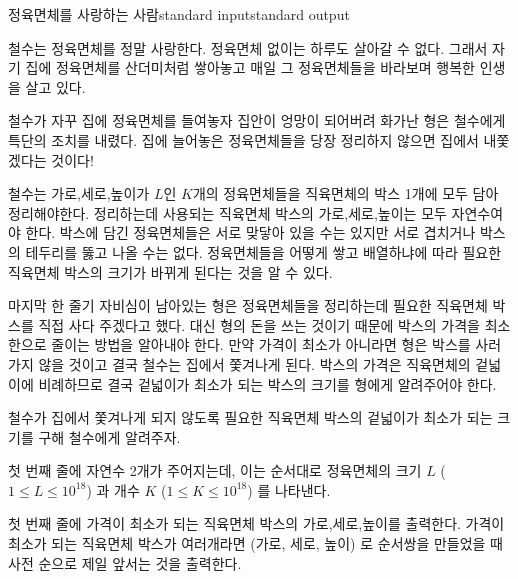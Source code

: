 \begin{problem}{정육면체를 사랑하는 사람}{standard input}{standard output}

철수는 정육면체를 정말 사랑한다. 정육면체 없이는 하루도 살아갈 수 없다.
그래서 자기 집에 정육면체를 산더미처럼 쌓아놓고 매일 그 정육면체들을 바라보며 행복한 인생을 살고 있다.

철수가 자꾸 집에 정육면체를 들여놓자 집안이 엉망이 되어버려 화가난 형은 철수에게 특단의 조치를 내렸다.
집에 늘어놓은 정육면체들을 당장 정리하지 않으면 집에서 내쫓겠다는 것이다!

철수는 가로,세로,높이가 $L$인 $K$개의 정육면체들을 직육면체의 박스 1개에 모두 담아 정리해야한다.
정리하는데 사용되는 직육면체 박스의 가로,세로,높이는 모두 자연수여야 한다.
박스에 담긴 정육면체들은 서로 맞닿아 있을 수는 있지만 서로 겹치거나 박스의 테두리를 뚫고 나올 수는 없다.
정육면체들을 어떻게 쌓고 배열하냐에 따라 필요한 직육면체 박스의 크기가 바뀌게 된다는 것을 알 수 있다.

마지막 한 줄기 자비심이 남아있는 형은 정육면체들을 정리하는데 필요한 직육면체 박스를 직접 사다 주겠다고 했다.
대신 형의 돈을 쓰는 것이기 때문에 박스의 가격을 최소한으로 줄이는 방법을 알아내야 한다.
만약 가격이 최소가 아니라면 형은 박스를 사러 가지 않을 것이고 결국 철수는 집에서 쫓겨나게 된다.
박스의 가격은 직육면체의 겉넓이에 비례하므로 결국 겉넓이가 최소가 되는 박스의 크기를 형에게 알려주어야 한다.

철수가 집에서 쫓겨나게 되지 않도록 필요한 직육면체 박스의 겉넓이가 최소가 되는 크기를 구해 철수에게 알려주자.

\InputFile
첫 번째 줄에 자연수 2개가 주어지는데,
이는 순서대로 정육면체의 크기 $L$ ($1 \le L \le 10^{18}$) 과 개수 $K$ ($1 \le K \le 10^{18}$) 를 나타낸다.

\OutputFile
첫 번째 줄에 가격이 최소가 되는 직육면체 박스의 가로,세로,높이를 출력한다.
가격이 최소가 되는 직육면체 박스가 여러개라면 (가로, 세로, 높이) 로 순서쌍을 만들었을 때
사전 순으로 제일 앞서는 것을 출력한다.

\Example

\begin{example}
%
%
\end{example}

\end{problem}
